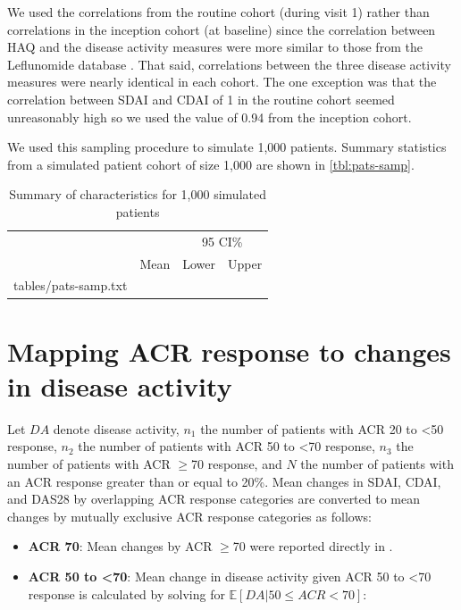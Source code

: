 \documentclass[11pt,final,fleqn]{article}
\makeatletter
\theoremstyle{plain}
\newcommand\E{\mathbb{E}}
\newcommand*\ExpandableInput[1]{\@@input#1 }
\makeatother
\begin{document}
\begin{appendices}
We used the correlations from the routine cohort (during visit 1) rather than correlations in the inception cohort (at baseline) since the correlation between HAQ and the disease activity measures were more similar to those from the Leflunomide database \citep{smolen2003simplified}. That said, correlations between the three disease activity measures were nearly identical in each cohort. The one exception was that the correlation between SDAI and CDAI of 1 in the routine cohort seemed unreasonably high so we used the value of 0.94 from the inception cohort. 



We used this sampling procedure to simulate 1,000 patients. Summary statistics from a simulated patient cohort of size 1,000 are shown in \autoref{tbl:pats-samp}.

\begin{table}[!ht]
\begin{center}
\begin{threeparttable}
\caption{Summary of characteristics for 1,000 simulated patients} \label{tbl:pats-samp}
\begin{tabularx}{\textwidth}{@{\extracolsep{\fill}}lccc}
\hline
\multicolumn{2}{c}{} & \multicolumn{2}{c}{95 CI\%} \\
\cmidrule{3-4}
\multicolumn{1}{l}{} & \multicolumn{1}{c}{Mean} & \multicolumn{1}{c}{Lower} & \multicolumn{1}{c}{Upper}\\
\hline
\ExpandableInput{tables/pats-samp.txt}
\hline
\end{tabularx}
\scriptsize
\end{threeparttable}
\end{center}
\end{table}

\section{Mapping ACR response to changes in disease activity}\label{app-acr-da}
Let $DA$ denote disease activity, $n_1$ the number of patients with ACR 20 to <50 response, $n_2$ the number of patients with ACR 50 to <70 response, $n_3$ the number of patients with ACR $\geq$70 response, and $N$ the number of patients with an ACR response greater than or equal to 20\%. Mean changes in SDAI, CDAI, and DAS28 by overlapping ACR response categories are converted to mean changes by mutually exclusive ACR response categories as follows:

\begin{itemize}
\item \textbf{ACR 70}: Mean changes by ACR $\geq$70 were reported directly in \citet{aletaha2005simplified}.
\item \textbf{ACR 50 to <70}: Mean change in disease activity given ACR 50 to <70 response is calculated by solving for $\E[DA|50 \leq ACR < 70]$:


\end{itemize}
\end{appendices}
\end{document}
